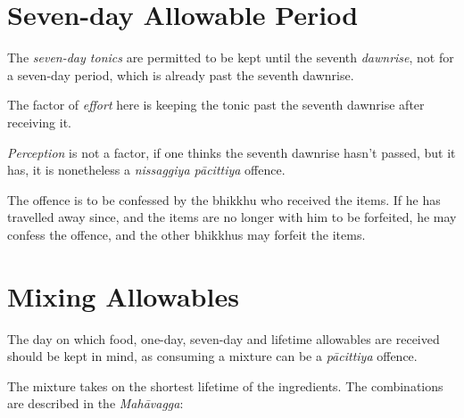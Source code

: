 \section*{Seven-day Allowable Period}

The \emph{seven-day tonics} are permitted to be kept until the seventh
\emph{dawnrise}, not for a seven-day period, which is already past the seventh
dawnrise.

The factor of \emph{effort} here is keeping the tonic past the seventh dawnrise
after receiving it.

\emph{Perception} is not a factor, if one thinks the seventh dawnrise hasn't
passed, but it has, it is nonetheless a \emph{nissaggiya pācittiya} offence.

The offence is to be confessed by the bhikkhu who received the items. If he has
travelled away since, and the items are no longer with him to be forfeited, he
may confess the offence, and the other bhikkhus may forfeit the items.

\section*{Mixing Allowables}

The day on which food, one-day, seven-day and lifetime allowables are received
should be kept in mind, as consuming a mixture can be a \emph{pācittiya}
offence.

The mixture takes on the shortest lifetime of the ingredients. 
The combinations are described in the \emph{Mahāvagga}:

\ifhandbookedition
\clearpage
\mbox{}\vfill
\fi

